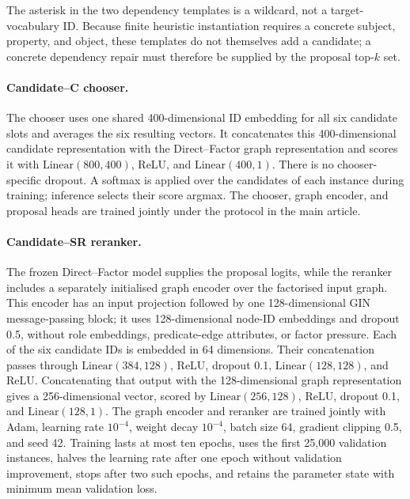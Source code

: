 \documentclass[a4paper,UKenglish,cleveref,autoref,thm-restate]{tgdk-v2021}
\begin{document}
The asterisk in the two dependency templates is a wildcard, not a target-vocabulary ID. Because finite heuristic instantiation requires a concrete subject, property, and object, these templates do not themselves add a candidate; a concrete dependency repair must therefore be supplied by the proposal top-\(k\) set.

\paragraph*{Candidate--C chooser.}
The chooser uses one shared 400-dimensional ID embedding for all six candidate slots and averages the six resulting vectors. It concatenates this 400-dimensional candidate representation with the Direct--Factor graph representation and scores it with \(\mathrm{Linear}(800,400)\), ReLU, and \(\mathrm{Linear}(400,1)\). There is no chooser-specific dropout. A softmax is applied over the candidates of each instance during training; inference selects their score argmax. The chooser, graph encoder, and proposal heads are trained jointly under the protocol in the main article.

\paragraph*{Candidate--SR reranker.}
The frozen Direct--Factor model supplies the proposal logits, while the reranker includes a separately initialised graph encoder over the factorised input graph. This encoder has an input projection followed by one 128-dimensional GIN message-passing block; it uses 128-dimensional node-ID embeddings and dropout 0.5, without role embeddings, predicate-edge attributes, or factor pressure. Each of the six candidate IDs is embedded in 64 dimensions. Their concatenation passes through \(\mathrm{Linear}(384,128)\), ReLU, dropout 0.1, \(\mathrm{Linear}(128,128)\), and ReLU. Concatenating that output with the 128-dimensional graph representation gives a 256-dimensional vector, scored by \(\mathrm{Linear}(256,128)\), ReLU, dropout 0.1, and \(\mathrm{Linear}(128,1)\). The graph encoder and reranker are trained jointly with Adam, learning rate \(10^{-4}\), weight decay \(10^{-4}\), batch size 64, gradient clipping 0.5, and seed 42. Training lasts at most ten epochs, uses the first 25,000 validation instances, halves the learning rate after one epoch without validation improvement, stops after two such epochs, and retains the parameter state with minimum mean validation loss.
\end{document}
